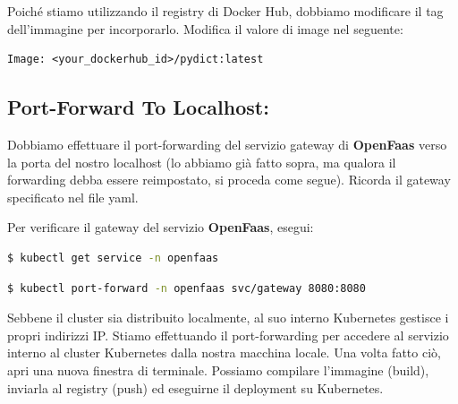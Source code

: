 \documentclass[11pt, a4paper]{article}
\begin{document}
Poiché stiamo utilizzando il registry di Docker Hub, dobbiamo modificare il tag dell'immagine per incorporarlo. Modifica il valore di image nel seguente:

\begin{lstlisting}
Image: <your_dockerhub_id>/pydict:latest
\end{lstlisting}

\subsection*{Port-Forward To Localhost:}
Dobbiamo effettuare il port-forwarding del servizio gateway di \textbf{OpenFaas} verso la porta del nostro localhost (lo abbiamo già fatto sopra, ma qualora il forwarding debba essere reimpostato, si proceda come segue). Ricorda il gateway specificato nel file yaml.


Per verificare il gateway del servizio \textbf{OpenFaas}, esegui:
\begin{lstlisting}[language=bash]
$ kubectl get service -n openfaas
\end{lstlisting}


\begin{lstlisting}[language=bash]
$ kubectl port-forward -n openfaas svc/gateway 8080:8080
\end{lstlisting}

Sebbene il cluster sia distribuito localmente, al suo interno Kubernetes gestisce i propri indirizzi IP. Stiamo effettuando il port-forwarding per accedere al servizio interno al cluster Kubernetes dalla nostra macchina locale. Una volta fatto ciò, apri una nuova finestra di terminale. Possiamo compilare l'immagine (build), inviarla al registry (push) ed eseguirne il deployment su Kubernetes.
\end{document}
